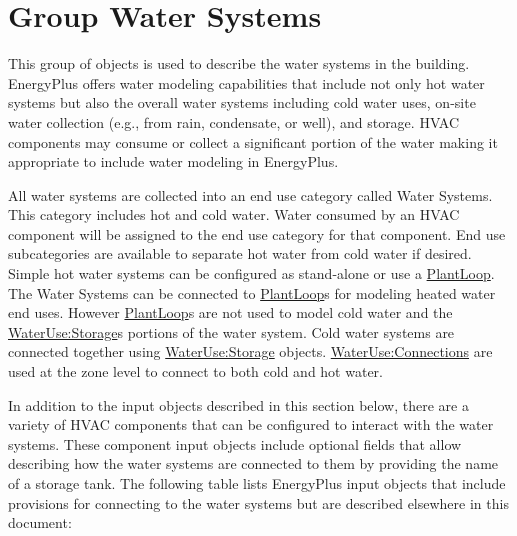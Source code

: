 \section{Group Water Systems}\label{group-water-systems}

This group of objects is used to describe the water systems in the building. EnergyPlus offers water modeling capabilities that include not only hot water systems but also the overall water systems including cold water uses, on-site water collection (e.g., from rain, condensate, or well), and storage. HVAC components may consume or collect a significant portion of the water making it appropriate to include water modeling in EnergyPlus.

All water systems are collected into an end use category called Water Systems. This category includes hot and cold water. Water consumed by an HVAC component will be assigned to the end use category for that component. End use subcategories are available to separate hot water from cold water if desired. Simple hot water systems can be configured as stand-alone or use a \hyperref[plantloop]{PlantLoop}. The Water Systems can be connected to \hyperref[plantloop]{PlantLoop}s for modeling heated water end uses. However \hyperref[plantloop]{PlantLoop}s are not used to model cold water and the \hyperref[waterusestorage]{WaterUse:Storage}s portions of the water system. Cold water systems are connected together using \hyperref[waterusestorage]{WaterUse:Storage} objects. \hyperref[wateruseconnections]{WaterUse:Connections} are used at the zone level to connect to both cold and hot water.

In addition to the input objects described in this section below, there are a variety of HVAC components that can be configured to interact with the water systems. These component input objects include optional fields that allow describing how the water systems are connected to them by providing the name of a storage tank. The following table lists EnergyPlus input objects that include provisions for connecting to the water systems but are described elsewhere in this document:

